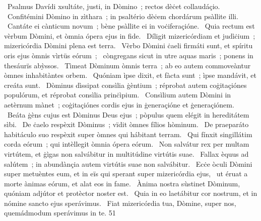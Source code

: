 {~Psalmus Davídi}
{%
xsultáte, justi, in Dòmino~; rectos dèċet collaudáçio. 
~Confitémini Dòmino in zìthara~; in psaltério dèċem chordárum psàllite illi. 
~Cantáte ei cànticum novum~; bène psàllite ei in voċiferaçióne. 
~Quia rectum est vèrbum Dòmini, et òmnia ópera ejus in fide. 
~Díligit mizericórdiam et judìċium~; mizericórdia Dòmini plena est terra. 
~Vèrbo Dòmini ċaeli firmáti sunt, et spíritu oris ejus òmnis vìrtüs eórum~; 
~còngregans sicut in utre aquas maris~; ponens in thesáurïs abỳssos. 
~Tìmeat Dòminum òmnis terra~; ab eo autem commoveàntur òmnes inhabitàntes orbem. 
~Quóniam ìpse dixit, et fàcta sunt~; ìpse mandávit, et creáta sunt. 
~Dòminus dìssipat consìlia ġèntium~; réprobat autem coġitaçiónes populórum, et réprobat consìlia prinċìpium. 
~Consìlium autem Dòmini in aetèrnum mànet~; coġitaçiónes cordis ejus in ġeneraçióne et ġeneraçiónem. 
~Beáta ġèns cujus est Dòminus Deus ejus~; pòpulus quem elégit in hereditátem sìbi. 
~De ċaelo respèxit Dòminus~; vïdit òmnes fílios hòminum. 
~De praeparáto habitáculo suo respèxit super òmnes qui hábitant terram. 
~Qui fínxit singillátim corda eórum~; qui intèllegit òmnia ópera eórum. 
~Non salvátur rex per multam virtútem, et ġìgas non salvábitur in multitúdine virtútis suae. 
~Fallax èquus ad salútem~; in abundànçia autem virtútis suae non salvábitur. 
~Ecċe òculi Dòmini super metuèntes eum, et in eïs qui sperant super mizericórdia ejus, 
~ut éruat a morte ànimas eórum, et alat eos in fame. 
~Ànima nostra sùstinet Dòminum, quóniam adjútor et protèctor noster est. 
~Quia in eo laetábitur cor nostrum, et in nómine sancto ejus sperávimus. 
~Fiat mizericórdia tua, Dòmine, super nos, quemádmodum sperávimus in te. 
}
{5}{1}
